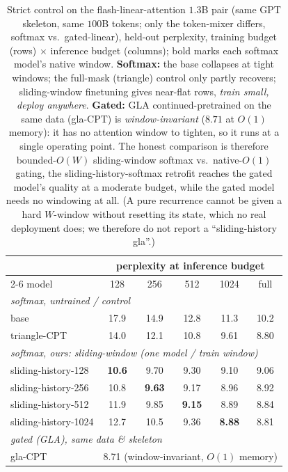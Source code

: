 \begin{table}[t]
\centering
\footnotesize
\setlength{\tabcolsep}{2.5pt}
\begin{tabular}{lccccc}
\toprule
& \multicolumn{5}{c}{perplexity at inference budget} \\
\cmidrule(lr){2-6}
model & 128 & 256 & 512 & 1024 & full \\
\midrule
\multicolumn{6}{l}{\emph{softmax, untrained / control}}\\
base               & 17.9 & 14.9 & 12.8 & 11.3 & 10.2 \\
triangle-CPT       & 14.0 & 12.1 & 10.8 & 9.61 & 8.80 \\
\multicolumn{6}{l}{\emph{softmax, ours: sliding-window (one model / train window)}}\\
sliding-history-128       & \textbf{10.6} & 9.70 & 9.30 & 9.10 & 9.06 \\
sliding-history-256       & 10.8 & \textbf{9.63} & 9.17 & 8.96 & 8.92 \\
sliding-history-512       & 11.9 & 9.85 & \textbf{9.15} & 8.89 & 8.84 \\
sliding-history-1024      & 12.7 & 10.5 & 9.36 & \textbf{8.88} & 8.81 \\
\midrule
\multicolumn{6}{l}{\emph{gated (GLA), same data \& skeleton}}\\
gla-CPT            & \multicolumn{5}{c}{8.71 \;(window-invariant, $O(1)$ memory)} \\
\bottomrule
\end{tabular}
\caption{Strict control on the flash-linear-attention $1.3$B pair (same GPT skeleton, same $100$B tokens; only the token-mixer differs, softmax vs.\ gated-linear), held-out perplexity, training budget (rows) $\times$ inference budget (columns); bold marks each softmax model's native window. \textbf{Softmax:} the base collapses at tight windows; the full-mask (triangle) control only partly recovers; sliding-window finetuning gives near-flat rows, \emph{train small, deploy anywhere}. \textbf{Gated:} GLA continued-pretrained on the same data (gla-CPT) is \emph{window-invariant} ($8.71$ at $O(1)$ memory): it has no attention window to tighten, so it runs at a single operating point. The honest comparison is therefore bounded-$O(W)$ sliding-window softmax vs.\ native-$O(1)$ gating, the sliding-history-softmax retrofit reaches the gated model's quality at a moderate budget, while the gated model needs no windowing at all. (A pure recurrence cannot be given a hard $W$-window without resetting its state, which no real deployment does; we therefore do not report a ``sliding-history gla''.)}
\label{tab:strictmatrix}
\end{table}
